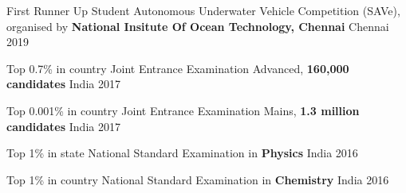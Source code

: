 
\begin{cvhonors}
  \cvhonor
    {First Runner Up}
    {Student Autonomous Underwater Vehicle Competition (SAVe), \break organised by\textbf{ National Insitute Of Ocean Technology, Chennai}} 
    {Chennai} 
    {2019}
 
  \cvhonor
    {Top 0.7\% in country}
    {Joint Entrance Examination Advanced, \textbf{160,000 candidates}} 
    {India} 
    {2017}

  \cvhonor
    {Top 0.001\% in country} 
    {Joint Entrance Examination Mains, \textbf{1.3 million candidates}} 
    {India}
    {2017}

 \cvhonor
    {Top 1\% in state} 
    {National Standard Examination in \textbf{Physics}}
    {India}
    {2016}
 
  \cvhonor
    {Top 1\% in country} 
    {National Standard Examination in \textbf{Chemistry}}
    {India}
    {2016}
 
\end{cvhonors}